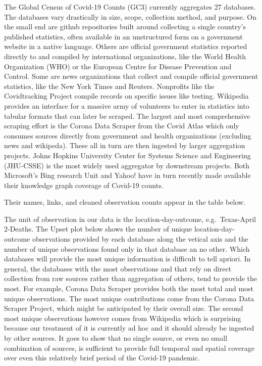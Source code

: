 \documentclass[
]{book}
\begin{document}
The Global Census of Covid-19 Counts (GC3) currently aggregates 27 databases. The databases vary drastically in size, scope, collection method, and purpose. On the small end are github repositories built around collecting a single country's published statistics, often available in an unstructured form on a government website in a native language. Others are official government statistics reported directly to and compiled by international organizations, like the World Health Organization (WHO) or the European Centre for Disease Prevention and Control. Some are news organizations that collect and compile official government statistics, like the New York Times and Reuters. Nonprofits like the Covidtracking Project compile records on specific issues like testing. Wikipedia provides an interface for a massive army of volunteers to enter in statistics into tabular formats that can later be scraped. The largest and most comprehensive scraping effort is the Corona Data Scraper from the Covid Atlas which only consumes sources directly from government and health organizations (excluding news and wikipeda). These all in turn are then ingested by larger aggregation projects. Johns Hopkins University Center for Systems Science and Engineering (JHU-CSSE) is the most widely used aggregator by downstream projects. Both Microsoft's Bing research Unit and Yahoo! have in turn recently made available their knowledge graph coverage of Covid-19 counts.

Their names, links, and cleaned observation counts appear in the table below.

\hypertarget{htmlwidget-53fed79daa8d98808eda}{}

The unit of observation in our data is the location-day-outcome, e.g.~Texas-April 2-Deaths. The Upset plot below shows the number of unique location-day-outcome observations provided by each database along the vetical axis and the number of unique observations found only in that database an no other. Which databases will provide the most unique information is difficult to tell apriori. In general, the databases with the most observations and that rely on direct collection from raw sources rather than aggregation of others, tend to provide the most. For example, Corona Data Scraper provides both the most total and most unique observations.
The most unique contributions come from the Corona Data Scraper Project, which might be anticipated by their overall size. The second most unique observations however comes from Wikipedia which is surprising because our treatment of it is currently ad hoc and it should already be ingested by other sources. It goes to show that no single source, or even no small combination of sources, is sufficient to provide full temporal and spatial coverage over even this relatively brief period of the Covid-19 pandemic.
\end{document}
